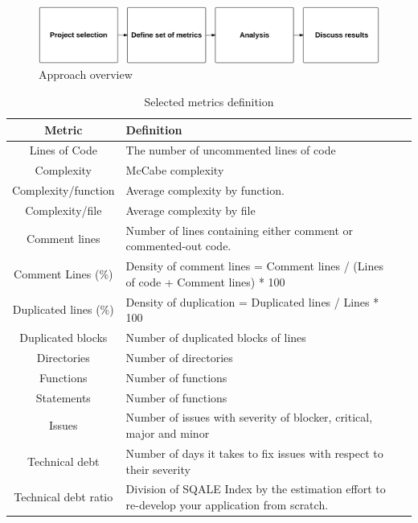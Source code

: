 
\begin{figure}[th]
    \caption{Approach overview}
    \centering
    \label{fig:approach_overview}
    \includegraphics[width=1\textwidth]{figures/approach_overview}
 \end{figure}


 \begin{table}[!hbt]
 	\begin{center}
 		\caption{Selected metrics definition}
 		\label{tab:metrics_definition}
 		\begin{tabular}{c| l l }
 			\toprule
 			\textbf{Metric} & \textbf{Definition} \\ \midrule
 			Lines of Code & The number of uncommented lines of code    \\
 			Complexity      & McCabe complexity    \\
 			Complexity/function & Average complexity by function. \\
 			Complexity/file & Average complexity by file \\
 			Comment lines  & Number of lines containing either comment or commented-out code. \\
 			Comment Lines (\%)   & Density of comment lines = Comment lines / (Lines of code + Comment lines) * 100    \\
 			Duplicated lines (\%)     & Density of duplication = Duplicated lines / Lines * 100    \\
 			Duplicated blocks   & Number of duplicated blocks of lines    \\
 			Directories   & Number of directories    \\
 			Functions            & Number of functions    \\
 			Statements      & Number of functions   \\
 			Issues    & Number of issues with severity of blocker, critical, major and minor   \\
 			Technical debt    & Number of days it takes to fix issues with respect to their severity    \\
 			Technical debt ratio   & Division of SQALE Index by the estimation effort to re-develop your application from scratch.    \\
 		\end{tabular}
 	\end{center}
 \end{table}

